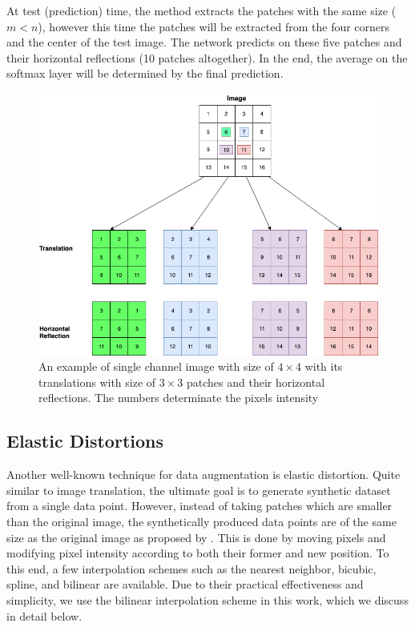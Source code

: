 At test (prediction) time, the method extracts the patches with the same size ($m < n$), however this time the
patches will be extracted from the four corners and the center of the test image. The network predicts on these
five patches and their horizontal reflections (10 patches altogether). In the end, the average
on the softmax layer will be determined by the final prediction.

\begin{figure}
  \centering
  \label{fig:label-preserving-trasformation}
  \includegraphics[width=1\textwidth]{fig/label-preserving-transformation}
  \caption{An example of single channel image with size of $4\times4$ with its translations with size of $3\times3$ patches and their horizontal reflections. The numbers determinate the pixels intensity}
\end{figure}


\subsection{Elastic Distortions}
\label{tit:elastic-distrotion}
Another well-known technique for data augmentation is elastic distortion. Quite similar to image
translation, the ultimate goal is to generate synthetic dataset from a single data point. However, instead of
taking patches which are smaller than the original image, the synthetically produced data points are
of the same size as the original image as proposed by \cite{elastic_distortion_paper} . This is done by moving pixels and modifying pixel intensity
according to both their former and new position.  To this end, a few interpolation schemes such as
the nearest neighbor, bicubic, spline, and bilinear are available. Due to their practical
effectiveness and simplicity, we use the bilinear interpolation scheme in this work, which we
discuss in detail below.

